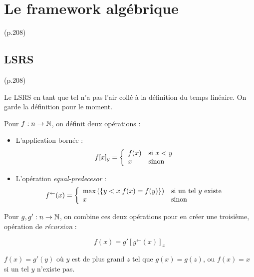 \documentclass{report}
\newcommand{\eqpred}[3]{#1\left[ #2^{\leftarrow}(#3) \right]_{#3}}
\begin{document}
		
		
	\section{Le framework algébrique} (p.208)
		\label{sec:framework_algebrique}

		\subsection{LSRS} (p.208)
			\label{subsec:LSRS}
		
		Le LSRS en tant que tel n'a pas l'air collé à la définition du temps linéaire. On garde la définition pour le moment.

		\begin{definition}
			\label{def:app_bornee_eq_pred}
			Pour $f : n \to \mathbb{N}$, on définit deux opérations :
			
			\begin{itemize}
				\item 	L'application bornée :
				\[
				f[x]_y = \left\lbrace \begin{array}{ll} 
					f(x) & \text{si $x<y$} \\
					x 	& \text{sinon}
				 \end{array} \right.
				\]
				
				\item 	L'opération \emph{equal-predecesor} :
				\[
				f^{\leftarrow}(x) = \left\lbrace \begin{array}{ll} 
					\max\left(\left\lbrace y < x | f(x) = f(y)\right\rbrace\right) & \text{si un tel $y$ existe} \\
					x	& \text{sinon}
				 \end{array} \right.
				\]
			\end{itemize}
			
			Pour $g, g' : n \to \mathbb{N}$, on combine ces deux opérations pour en créer une troisième, opération de \emph{récursion} :
			
			\[
			f(x) = \eqpred{g'}{g}{x}
			\]
			
			$f(x) = g'(y)$ où $y$ est de plus grand $z$ tel que $g(x) = g(z)$, ou $f(x) = x$ si un tel $y$ n'existe pas.
		\end{definition}
		
\end{document}
